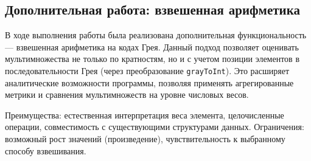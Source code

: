 \documentclass[12pt,a4paper]{article}
\begin{document}
\subsection{Дополнительная работа: взвешенная арифметика}

В ходе выполнения работы была реализована дополнительная функциональность — взвешенная арифметика на кодах Грея. Данный подход позволяет оценивать мультимножества не только по кратностям, но и с учетом позиции элементов в последовательности Грея (через преобразование \texttt{grayToInt}). Это расширяет аналитические возможности программы, позволяя применять агрегированные метрики и сравнения мультимножеств на уровне числовых весов.

Преимущества: естественная интерпретация веса элемента, целочисленные операции, совместимость с существующими структурами данных. Ограничения: возможный рост значений (произведение), чувствительность к выбранному способу взвешивания.

\newpage
\end{document}

